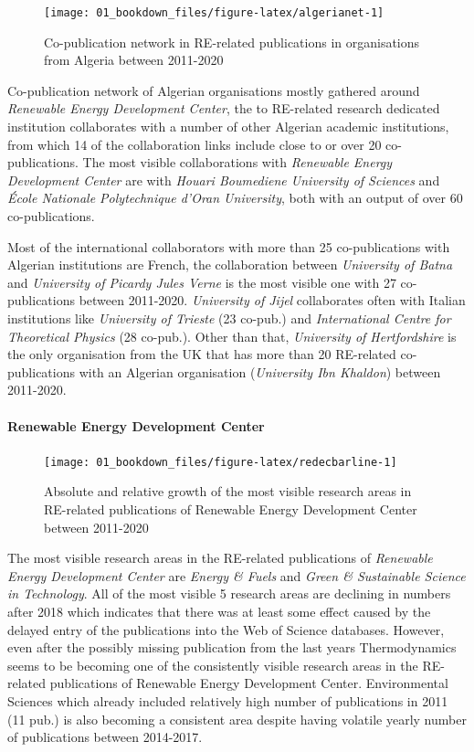 \documentclass[
]{book}
\begin{document}
\begin{figure}
\texttt{[image: 01\_bookdown\_files/figure-latex/algerianet-1]} \caption{Co-publication network in RE-related publications in organisations from Algeria between 2011-2020}\label{fig:algerianet}
\end{figure}

Co-publication network of Algerian organisations mostly gathered around \emph{Renewable Energy Development Center}, the to RE-related research dedicated institution collaborates with a number of other Algerian academic institutions, from which 14 of the collaboration links include close to or over 20 co-publications. The most visible collaborations with \emph{Renewable Energy Development Center} are with \emph{Houari Boumediene University of Sciences} and \emph{École Nationale Polytechnique d'Oran University}, both with an output of over 60 co-publications.

Most of the international collaborators with more than 25 co-publications with Algerian institutions are French, the collaboration between \emph{University of Batna} and \emph{University of Picardy Jules Verne} is the most visible one with 27 co-publications between 2011-2020. \emph{University of Jijel} collaborates often with Italian institutions like \emph{University of Trieste} (23 co-pub.) and \emph{International Centre for Theoretical Physics} (28 co-pub.). Other than that, \emph{University of Hertfordshire} is the only organisation from the UK that has more than 20 RE-related co-publications with an Algerian organisation (\emph{University Ibn Khaldon}) between 2011-2020.

\hypertarget{renewable-energy-development-center}{%
\paragraph{Renewable Energy Development Center}\label{renewable-energy-development-center}}

\begin{figure}
\texttt{[image: 01\_bookdown\_files/figure-latex/redecbarline-1]} \caption{Absolute and relative growth of the most visible research areas in RE-related publications of Renewable Energy Development Center between 2011-2020}\label{fig:redecbarline}
\end{figure}

The most visible research areas in the RE-related publications of \emph{Renewable Energy Development Center} are \emph{Energy \& Fuels} and \emph{Green \& Sustainable Science in Technology}. All of the most visible 5 research areas are declining in numbers after 2018 which indicates that there was at least some effect caused by the delayed entry of the publications into the Web of Science databases. However, even after the possibly missing publication from the last years Thermodynamics seems to be becoming one of the consistently visible research areas in the RE-related publications of Renewable Energy Development Center. Environmental Sciences which already included relatively high number of publications in 2011 (11 pub.) is also becoming a consistent area despite having volatile yearly number of publications between 2014-2017.
\end{document}
